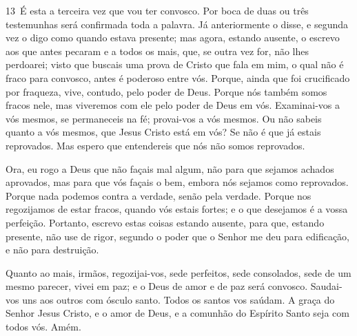 \medskip

\lettrine{13}\ É esta a terceira vez que vou ter convosco. Por
boca de duas ou três testemunhas será confirmada toda a palavra.
Já anteriormente o disse, e segunda vez o digo como quando
estava presente; mas agora, estando ausente, o escrevo aos que antes
pecaram e a todos os mais, que, se outra vez for, não lhes
perdoarei; visto que buscais uma prova de Cristo que fala em
mim, o qual não é fraco para convosco, antes é poderoso entre vós.
Porque, ainda que foi crucificado por fraqueza, vive, contudo,
pelo poder de Deus. Porque nós também somos fracos nele, mas
viveremos com ele pelo poder de Deus em vós. Examinai-vos a vós
mesmos, se permaneceis na fé; provai-vos a vós mesmos. Ou não sabeis
quanto a vós mesmos, que Jesus Cristo está em vós? Se não é que já
estais reprovados. Mas espero que entendereis que nós não somos
reprovados.

Ora, eu rogo a Deus que não façais mal algum, não para que sejamos
achados aprovados, mas para que vós façais o bem, embora nós sejamos
como reprovados. Porque nada podemos contra a verdade, senão
pela verdade. Porque nos regozijamos de estar fracos, quando vós
estais fortes; e o que desejamos é a vossa perfeição.
Portanto, escrevo estas coisas estando ausente, para que,
estando presente, não use de rigor, segundo o poder que o Senhor me
deu para edificação, e não para destruição.

Quanto ao mais, irmãos, regozijai-vos, sede perfeitos, sede
consolados, sede de um mesmo parecer, vivei em paz; e o Deus de amor
e de paz será convosco. Saudai-vos uns aos outros com ósculo
santo. Todos os santos vos saúdam. A graça do Senhor
Jesus Cristo, e o amor de Deus, e a comunhão do Espírito Santo seja
com todos vós. Amém.

